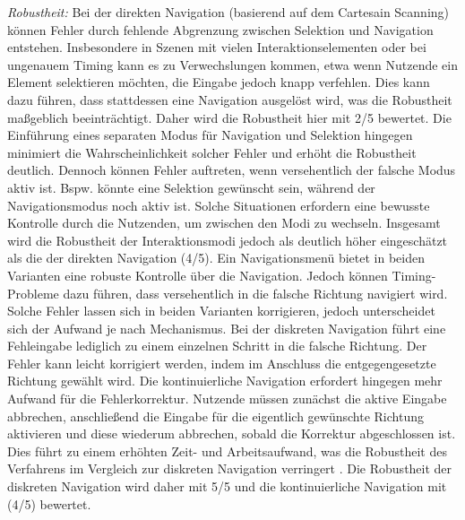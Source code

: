 \textit{Robustheit:}
Bei der direkten Navigation (basierend auf dem Cartesain Scanning) können Fehler durch fehlende Abgrenzung zwischen Selektion und Navigation entstehen. Insbesondere in Szenen mit vielen Interaktionselementen oder bei ungenauem Timing kann es zu Verwechslungen kommen, etwa wenn Nutzende ein Element selektieren möchten, die Eingabe jedoch knapp verfehlen. Dies kann dazu führen, dass stattdessen eine Navigation ausgelöst wird, was die Robustheit maßgeblich beeinträchtigt. Daher wird die Robustheit hier mit 2/5 bewertet. Die Einführung eines separaten Modus für Navigation und Selektion hingegen minimiert die Wahrscheinlichkeit solcher Fehler und erhöht die Robustheit deutlich. Dennoch können Fehler auftreten, wenn versehentlich der falsche Modus aktiv ist. Bspw. könnte eine Selektion gewünscht sein, während der Navigationsmodus noch aktiv ist. Solche Situationen erfordern eine bewusste Kontrolle durch die Nutzenden, um zwischen den Modi zu wechseln. Insgesamt wird die Robustheit der Interaktionsmodi jedoch als deutlich höher eingeschätzt als die der direkten Navigation (4/5).
Ein Navigationsmenü bietet in beiden Varianten eine robuste Kontrolle über die Navigation. Jedoch können Timing-Probleme dazu führen, dass versehentlich in die falsche Richtung navigiert wird. Solche Fehler lassen sich in beiden Varianten korrigieren, jedoch unterscheidet sich der Aufwand je nach Mechanismus. Bei der diskreten Navigation führt eine Fehleingabe lediglich zu einem einzelnen Schritt in die falsche Richtung. Der Fehler kann leicht korrigiert werden, indem im Anschluss die entgegengesetzte Richtung gewählt wird. Die kontinuierliche Navigation erfordert hingegen mehr Aufwand für die Fehlerkorrektur. Nutzende müssen zunächst die aktive Eingabe abbrechen, anschließend die Eingabe für die eigentlich gewünschte Richtung aktivieren und diese wiederum abbrechen, sobald die Korrektur abgeschlossen ist. Dies führt zu einem erhöhten Zeit- und Arbeitsaufwand, was die Robustheit des Verfahrens im Vergleich zur diskreten Navigation verringert \citep{10.1145/2159365.2159386}. Die Robustheit der diskreten Navigation wird daher mit 5/5 und die kontinuierliche Navigation mit (4/5) bewertet. 


